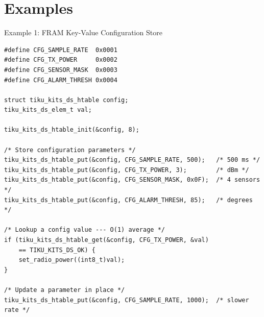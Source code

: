 \documentclass[aspectratio=169, 10pt]{beamer}
\begin{document}
\section{Examples}

\begin{frame}[fragile]{Example 1: FRAM Key-Value Configuration Store}
\begin{lstlisting}[style=cstyle,
  title={Persistent configuration with key-value lookup}]
#define CFG_SAMPLE_RATE  0x0001
#define CFG_TX_POWER     0x0002
#define CFG_SENSOR_MASK  0x0003
#define CFG_ALARM_THRESH 0x0004

struct tiku_kits_ds_htable config;
tiku_kits_ds_elem_t val;

tiku_kits_ds_htable_init(&config, 8);

/* Store configuration parameters */
tiku_kits_ds_htable_put(&config, CFG_SAMPLE_RATE, 500);   /* 500 ms */
tiku_kits_ds_htable_put(&config, CFG_TX_POWER, 3);        /* dBm */
tiku_kits_ds_htable_put(&config, CFG_SENSOR_MASK, 0x0F);  /* 4 sensors */
tiku_kits_ds_htable_put(&config, CFG_ALARM_THRESH, 85);   /* degrees */

/* Lookup a config value --- O(1) average */
if (tiku_kits_ds_htable_get(&config, CFG_TX_POWER, &val)
    == TIKU_KITS_DS_OK) {
    set_radio_power((int8_t)val);
}

/* Update a parameter in place */
tiku_kits_ds_htable_put(&config, CFG_SAMPLE_RATE, 1000);  /* slower rate */
\end{lstlisting}
\end{frame}
\end{document}
